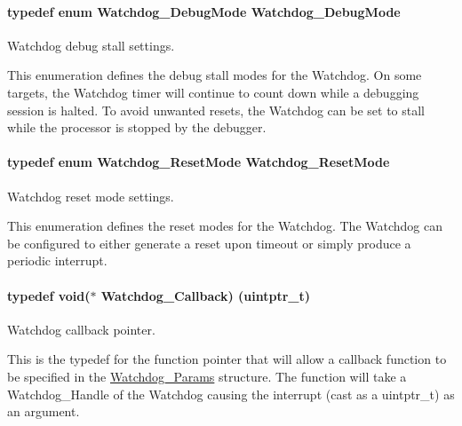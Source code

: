 \paragraph[{Watchdog\+\_\+\+Debug\+Mode}]{\setlength{\rightskip}{0pt plus 5cm}typedef enum {\bf Watchdog\+\_\+\+Debug\+Mode}  {\bf Watchdog\+\_\+\+Debug\+Mode}}\label{_watchdog_8h_a369f0c40c3acb08f0ad21df99aedd42f}


Watchdog debug stall settings. 

This enumeration defines the debug stall modes for the Watchdog. On some targets, the Watchdog timer will continue to count down while a debugging session is halted. To avoid unwanted resets, the Watchdog can be set to stall while the processor is stopped by the debugger. 
\paragraph[{Watchdog\+\_\+\+Reset\+Mode}]{\setlength{\rightskip}{0pt plus 5cm}typedef enum {\bf Watchdog\+\_\+\+Reset\+Mode}  {\bf Watchdog\+\_\+\+Reset\+Mode}}\label{_watchdog_8h_a49befb9cfb12eb30c8832809bcbaa3a4}


Watchdog reset mode settings. 

This enumeration defines the reset modes for the Watchdog. The Watchdog can be configured to either generate a reset upon timeout or simply produce a periodic interrupt. 
\paragraph[{Watchdog\+\_\+\+Callback}]{\setlength{\rightskip}{0pt plus 5cm}typedef void($\ast$ Watchdog\+\_\+\+Callback) (uintptr\+\_\+t)}\label{_watchdog_8h_abb9d5f385013e9950884200d8d05fd05}


Watchdog callback pointer. 

This is the typedef for the function pointer that will allow a callback function to be specified in the \hyperlink{struct_watchdog___params}{Watchdog\+\_\+\+Params} structure. The function will take a Watchdog\+\_\+\+Handle of the Watchdog causing the interrupt (cast as a uintptr\+\_\+t) as an argument. 
